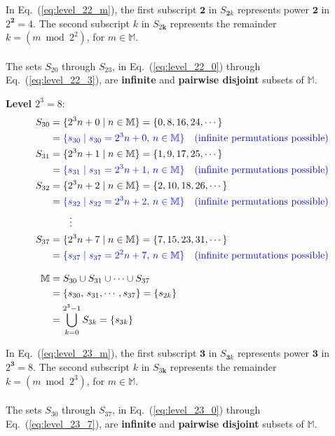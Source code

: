 \documentclass[12pt]{article}
\theoremstyle{definition} %
\numberwithin{equation}{section}
\newcommand{\eqrefc}[1]{Eq.~(\ref{eq:#1})}
\begin{document}
In \eqrefc{level_22_m}, the first subscript \(\bm{2}\) 
in \(S_{\bm{2}k} \) represents power
\(\bm{2}\) in \(2^{\bm{2}}=4\). The second subscript \(k\) in \(S_{2\bm{k}} \) represents the remainder \(k = (m \bmod 2^2)\), for \(m \in \mathbb{M}\).\\
\\
The sets \(S_{20}\) through \(S_{23}\), in \eqrefc{level_22_0} through \eqrefc{level_22_3}, are \textbf{infinite} and \textbf{pairwise disjoint} subsets of \(\mathbb{M}\). 

\textbf{Level \(2^3=8\)}:
\begin{align}
S_{30} &= \{2^3n + 0 \mid n \in \mathbb{M}\} = \{0, 8,  16, 24, \cdots\} \label{eq:level_23_0} \\
&= \textcolor{blue}{\{s_{30} \mid s_{30} = 2^3n + 0,\,n \in \mathbb{M}\}} \quad \textcolor{blue}{\text{(infinite permutations possible)}}\\
S_{31} &= \{2^3n + 1 \mid n \in \mathbb{M}\} = \{1, 9,  17, 25, \cdots\} \\
&= \textcolor{blue}{\{s_{31} \mid s_{31} = 2^3n + 1,\,n \in \mathbb{M}\}} \quad \textcolor{blue}{\text{(infinite permutations possible)}}\\
S_{32} &= \{2^3n + 2 \mid n\in \mathbb{M}\}  = \{2, 10, 18, 26, \cdots\} \\
&= \textcolor{blue}{\{s_{32} \mid s_{32} = 2^3n + 2,\,n \in \mathbb{M}\}} \quad \textcolor{blue}{\text{(infinite permutations possible)}} \\
&\qquad \vdots \nonumber \\
S_{37} &= \{2^3n + 7 \mid n \in \mathbb{M}\} = \{7, 15, 23, 31, \cdots\} \label{eq:level_23_7} \\
&= \textcolor{blue}{\{s_{37} \mid s_{37} = 2^2n + 7,\,n \in \mathbb{M}\}} \quad \textcolor{blue}{\text{(infinite permutations possible)}}\\[2ex]
\mathbb{M} &= S_{30} \cup S_{31} \cup\cdots \cup S_{37} \\
 &=\{s_{30},\, s_{31}, \cdots, s_{37}\} = \{ s_{2k} \} \\
&= \bigcup_{k=0}^{2^3-1}S_{3k} = \{ s_{3k} \} \label{eq:level_23_m} 
\end{align}

In \eqrefc{level_23_m}, the first subscript \(\bm{3}\) 
in \(S_{\bm{3}k} \) represents power
\(\bm{3}\) in \(2^{\bm{3}}=8\). The second subscript \(k\) in \(S_{3\bm{k}} \) represents the remainder \(k = (m \bmod 2^3)\), for \(m \in \mathbb{M}\).\\
\\
The sets \(S_{30}\) through \(S_{37}\), in \eqrefc{level_23_0} through \eqrefc{level_23_7}, are \textbf{infinite} and \textbf{pairwise disjoint} subsets of \(\mathbb{M}\). 
\end{document}

